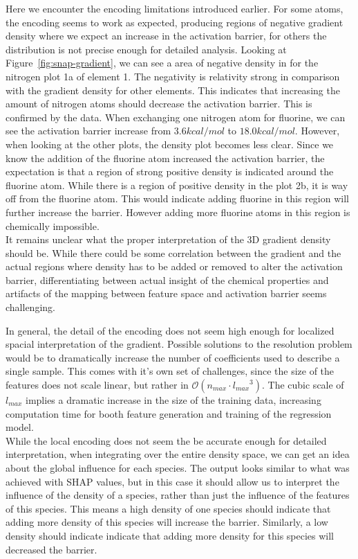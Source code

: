 Here we encounter the encoding limitations introduced earlier.
For some atoms, the encoding seems to work as expected, producing regions of negative gradient density where we expect
an increase in the activation barrier, for others the distribution is not precise enough for detailed analysis.
Looking at Figure~\ref{fig:snap-gradient}, we can see a area of negative density in for the nitrogen plot 1a of element 1.
The negativity is relativity strong in comparison with the gradient density for other elements.
This indicates that increasing the amount of nitrogen atoms should decrease the activation barrier.
This is confirmed by the data.
When exchanging one nitrogen atom for fluorine, we can see the activation barrier increase from $3.6 kcal/mol$ to $18.0kcal/mol$.
However, when looking at the other plots, the density plot becomes less clear.
Since we know the addition of the fluorine atom increased the activation barrier, the expectation is that a region of strong positive
density is indicated around the fluorine atom.
While there is a region of positive density in the plot 2b, it is way off from the fluorine atom.
This would indicate adding fluorine in this region will further increase the barrier.
However adding more fluorine atoms in this region is chemically impossible. %
\\

It remains unclear what the proper interpretation of the 3D gradient density should be.
While there could be some correlation between the gradient and the actual regions where density has to be added or
removed to alter the activation barrier, differentiating between actual insight of the chemical properties and artifacts 
of the mapping between feature space and activation barrier seems challenging.

In general, the detail of the encoding does not seem high enough for localized spacial interpretation of the gradient.
Possible solutions to the resolution problem would be to dramatically increase the number of coefficients used to describe a single sample.
This comes with it's own set of challenges, since the size of the features does not scale linear, but rather in $\mathcal{O}(n_{max} \cdot {l_{max}}^3)$.
The cubic scale of $l_{max}$ implies a dramatic increase in the size of the training data, increasing computation time for booth feature generation and training of the regression model.
\\

While the local encoding does not seem the be accurate enough for detailed interpretation,
when integrating over the entire density space, we can get an idea about the global influence for each species.
The output looks similar to what was achieved with SHAP values, but in this case it should allow us to interpret
the influence of the density of a species, rather than just the influence of the features of this species.
This means a high density of one species should indicate that adding more density of this species will increase the barrier.
Similarly, a low density should indicate indicate that adding more density for this species will decreased the barrier.

